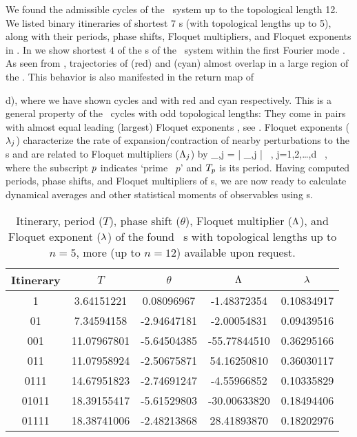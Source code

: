 \documentclass[aip,cha,
reprint,
secnumarabic,
nofootinbib, tightenlines,
nobibnotes, showkeys, showpacs,
superscriptaddress,
]{revtex4-1}
\begin{document}
We found the admissible cycles of the \twomode\ system up to the 
topological length 12. We listed binary itineraries of shortest $7$ 
\rpo s (with topological lengths up to 5), along with their
periods, phase shifts, Floquet multipliers, and Floquet exponents in
. In  we show 
shortest $4$ of the \rpo s of the \twomode\ system within the first 
Fourier mode \slicePlane . As seen from , 
trajectories of  (red) and  (cyan) almost 
overlap in a large region of the \statesp . This behavior is also 
manifested in the return map of \,{d), 
where we have shown cycles  and  with red 
and cyan respectively. This is a general property of the \twomode\
cycles with odd topological lengths: They come in pairs with 
almost equal leading (largest) Floquet exponents , see 
. Floquet exponents ($\lambda_j$) 
characterize the rate of expansion/contraction of nearby perturbations 
to the \rpo s and are related to Floquet multipliers ($\Lambda_j$) 
by
\beq
    \Lyap_{\rpprime,j} = 
                         \ln | \ExpaEig_{\rpprime,j} |
                         \, , \quad j=1,2,\dots,d \, ,
\eeq
where the subscript $p$ indicates `prime \rpo\ $p$' and 
${T_{p}}$ is its period. Having computed periods, phase 
shifts, and Floquet multipliers of \rpo s, we are now ready to 
calculate dynamical averages and other statistical moments of 
observables using \cycForm s.

\begin{table}
	\begin{tabular}{c|c|c|c|c}
	Itinerary & $T$ & $\theta$ & $\Lambda$ & $\lambda$ \\ 
	\hline
	1 & 3.64151221 & 0.08096967 & -1.48372354 &0.10834917 \\ 
	01 & 7.34594158 & -2.94647181 & -2.00054831 &0.09439516 \\ 
	001 & 11.07967801 & -5.64504385 & -55.77844510 &0.36295166 \\ 
	011 & 11.07958924 & -2.50675871 & 54.16250810 &0.36030117 \\ 
	0111 & 14.67951823 & -2.74691247 & -4.55966852 &0.10335829 \\ 
	01011 & 18.39155417 & -5.61529803 & -30.00633820 &0.18494406 \\ 
	01111 & 18.38741006 & -2.48213868 & 28.41893870 &0.18202976 \\ 
	\end{tabular}
	\caption{Itinerary, period ($T$), phase shift ($\theta$), 
			 Floquet multiplier ($\Lambda$), and Floquet exponent
			 ($\lambda$) of the found \twomode\ \rpo s with topological
			 lengths up to $n = 5$, more (up to $n=12$) available 
			 upon request.}
	\label{t-rpofirst10}
\end{table}

}
\end{document}
